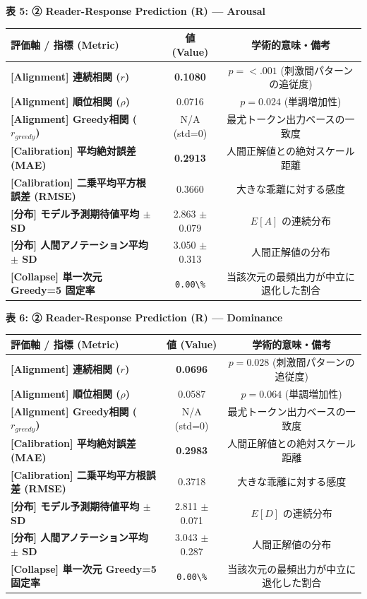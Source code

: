 \textbf{表 5: ② Reader-Response Prediction (R) — Arousal}
\begin{center}
\small
\begin{tabular}{lcc}
\toprule
\textbf{評価軸 / 指標 (Metric)} & \textbf{値 (Value)} & \textbf{学術的意味・備考} \\
\midrule
\textbf{[Alignment] 連続相関 ($r$)} & \textbf{0.1080} & $p = <.001 $ (刺激間パターンの追従度) \\
\textbf{[Alignment] 順位相関 ($\rho$)} & 0.0716 & $p = 0.024 $ (単調増加性) \\
\textbf{[Alignment] Greedy相関 ($r_{greedy}$)} & N/A (std=0) & 最尤トークン出力ベースの一致度 \\
\textbf{[Calibration] 平均絶対誤差 (MAE)} & \textbf{0.2913} & 人間正解値との絶対スケール距離 \\
\textbf{[Calibration] 二乗平均平方根誤差 (RMSE)} & 0.3660 & 大きな乖離に対する感度 \\
\textbf{[分布] モデル予測期待値平均 $\pm$ SD} & 2.863 $\pm$ 0.079 & $E[A]$ の連続分布 \\
\textbf{[分布] 人間アノテーション平均 $\pm$ SD} & 3.050 $\pm$ 0.313 & 人間正解値の分布 \\
\textbf{[Collapse] 単一次元 Greedy=5 固定率} & \texttt{0.00\textbackslash{}\%} & 当該次元の最頻出力が中立に退化した割合 \\
\bottomrule
\end{tabular}
\end{center}


\textbf{表 6: ② Reader-Response Prediction (R) — Dominance}
\begin{center}
\small
\begin{tabular}{lcc}
\toprule
\textbf{評価軸 / 指標 (Metric)} & \textbf{値 (Value)} & \textbf{学術的意味・備考} \\
\midrule
\textbf{[Alignment] 連続相関 ($r$)} & \textbf{0.0696} & $p = 0.028 $ (刺激間パターンの追従度) \\
\textbf{[Alignment] 順位相関 ($\rho$)} & 0.0587 & $p = 0.064 $ (単調増加性) \\
\textbf{[Alignment] Greedy相関 ($r_{greedy}$)} & N/A (std=0) & 最尤トークン出力ベースの一致度 \\
\textbf{[Calibration] 平均絶対誤差 (MAE)} & \textbf{0.2983} & 人間正解値との絶対スケール距離 \\
\textbf{[Calibration] 二乗平均平方根誤差 (RMSE)} & 0.3718 & 大きな乖離に対する感度 \\
\textbf{[分布] モデル予測期待値平均 $\pm$ SD} & 2.811 $\pm$ 0.071 & $E[D]$ の連続分布 \\
\textbf{[分布] 人間アノテーション平均 $\pm$ SD} & 3.043 $\pm$ 0.287 & 人間正解値の分布 \\
\textbf{[Collapse] 単一次元 Greedy=5 固定率} & \texttt{0.00\textbackslash{}\%} & 当該次元の最頻出力が中立に退化した割合 \\
\bottomrule
\end{tabular}
\end{center}



